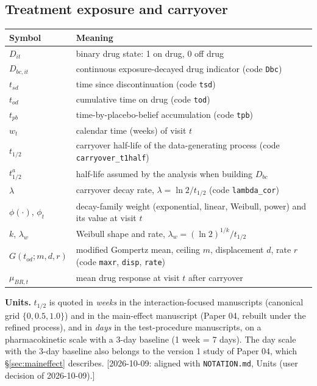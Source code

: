 \documentclass[11pt]{article}
\newcommand{\note}[1]{\textcolor{blue!60!black}{\small [#1]}}
\newcommand{\code}[1]{\texttt{#1}}
\begin{document}
\subsection{Treatment exposure and carryover}

\begin{center}
\begin{tabular}{@{}lp{}@{}}
\toprule
Symbol & Meaning \\
\midrule
$D_{it}$ & binary drug state: 1 on drug, 0 off drug \\
$D_{bc,it}$ & continuous exposure-decayed drug indicator (code \code{Dbc}) \\
$t_{sd}$ & time since discontinuation (code \code{tsd}) \\
$t_{od}$ & cumulative time on drug (code \code{tod}) \\
$t_{pb}$ & time-by-placebo-belief accumulation (code \code{tpb}) \\
$w_t$ & calendar time (weeks) of visit $t$ \\
$t_{1/2}$ & carryover half-life of the data-generating process (code \code{carryover\_t1half}) \\
$t_{1/2}^a$ & half-life assumed by the analysis when building $D_{bc}$ \\
$\lambda$ & carryover decay rate, $\lambda = \ln 2 / t_{1/2}$ (code \code{lambda\_cor}) \\
$\phi(\cdot)$, $\phi_t$ & decay-family weight (exponential, linear, Weibull, power) and its value at visit $t$ \\
$k$, $\lambda_w$ & Weibull shape and rate, $\lambda_w = (\ln 2)^{1/k}/t_{1/2}$ \\
$G(t_{od}; m, d, r)$ & modified Gompertz mean, ceiling $m$, displacement $d$, rate $r$ (code \code{maxr}, \code{disp}, \code{rate}) \\
$\mu_{BR,t}$ & mean drug response at visit $t$ after carryover \\
\bottomrule
\end{tabular}
\end{center}

\textbf{Units.} $t_{1/2}$ is quoted in \emph{weeks} in the
interaction-focused manuscripts (canonical grid $\{0, 0.5, 1.0\}$) and
in the main-effect manuscript (Paper 04, rebuilt under the refined
process), and in \emph{days} in the test-procedure manuscripts, on a
pharmacokinetic scale with a 3-day baseline (1 week = 7 days). The day
scale with the 3-day baseline also belongs to the version 1 study of
Paper 04, which \S\ref{sec:maineffect} describes. \note{2026-10-09:
aligned with \code{NOTATION.md}, Units (user decision of 2026-10-09).}
\end{document}
